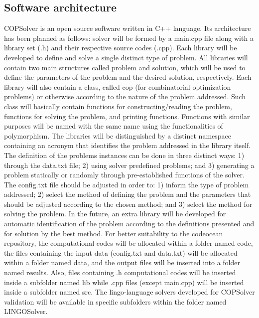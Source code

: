 \documentclass[11pt, letterpaper]{article}
\begin{document}
\subsection{Software architecture}

COPSolver is an open source software written in C++ language. Its architecture has been planned as follows: solver will be formed by a main.cpp file along with a library set (.h) and their respective source codes (.cpp). Each library will be developed to define and solve a single distinct type of problem. All libraries will contain two main structures called problem and solution, which will be used to define the parameters of the problem and the desired solution, respectively. Each library will also contain a class, called cop (for combinatorial optimization problems) or otherwise according to the nature of the problem addressed. Such class will basically contain functions for constructing/reading the problem, functions for solving the problem, and printing functions. Functions with similar purposes will be named with the same name using the functionalities of polymorphism. The libraries will be distinguished by a distinct namespace containing an acronym that identifies the problem addressed in the library itself. The definition of the problems instances can be done in three distinct ways: 1) through the data.txt file; 2) using solver predefined problems; and 3) generating a problem statically or randomly through pre-established functions of the solver. The config.txt file should be adjusted in order to: 1) inform the type of problem addressed; 2) select the method of defining the problem and the parameters that should be adjusted according to the chosen method; and 3) select the method for solving the problem. In the future, an extra library will be developed for automatic identification of the problem according to the definitions presented and for solution by the best method. For better suitability to the codeocean repository, the computational codes will be allocated within a folder named code, the files containing the input data (config.txt and data.txt) will be allocated within a folder named data, and the output files will be inserted into a folder named results. Also, files containing .h computational codes will be inserted inside a subfolder named lib while .cpp files (except main.cpp) will be inserted inside a subfolder named src. The lingo-language solvers developed for COPSolver validation will be available in specific subfolders within the folder named LINGOSolver.
\end{document}
